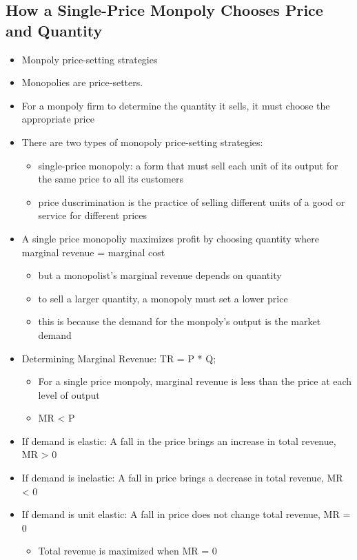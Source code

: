 \documentclass[11pt]{article}
\begin{document}
\subsection{How a Single-Price Monpoly Chooses Price and Quantity}
\label{sec:orgd5369b2}
\begin{itemize}
\item Monpoly price-setting strategies
\item Monopolies are price-setters.
\item For a monpoly firm to determine the quantity it sells, it must choose the appropriate price
\item There are two types of monopoly price-setting strategies:
\begin{itemize}
\item single-price monopoly: a form that must sell each unit of its output for the same price to all its customers
\item price duscrimination is the practice of selling different units of a good or service for different prices
\end{itemize}
\item A single price monopoliy maximizes profit by choosing quantity where marginal revenue = marginal cost
\begin{itemize}
\item but a monopolist's marginal revenue depends on quantity
\item to sell a larger quantity, a monopoly must set a lower price
\item this is because the demand for the monpoly's output is the market demand
\end{itemize}
\item Determining Marginal Revenue: TR = P * Q;
\begin{itemize}
\item For a single price monpoly, marginal revenue is less than the price at each level of output
\item MR < P
\end{itemize}
\item If demand is elastic: A fall in the price brings an increase in total revenue, MR > 0
\item If demand is inelastic: A fall in price brings a decrease in total revenue, MR < 0
\item If demand is unit elastic: A fall in price does not change total revenue, MR = 0
\begin{itemize}
\item Total revenue is maximized when MR = 0

\end{itemize}
\end{itemize}
\end{document}
